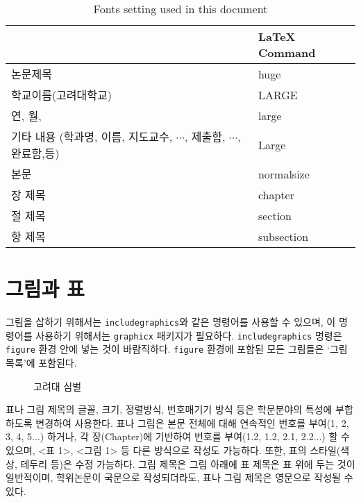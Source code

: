 \documentclass[11pt]{report}
\begin{document}
\begin{table}\centering
\caption{Fonts setting used in this document}
\vspace{0.5cm}
\begin{tabular}{  m{7cm}  m{5cm} }
\toprule 				&     \LaTeX{} Command \\\midrule
논문제목				& huge \\
학교이름(고려대학교)	& LARGE \\
연, 월, 				& large\\
기타 내용 (학과명, 이름, 지도교수, \(\cdots\), 제출함, \(\cdots\), 완료함,등)	& Large\\
본문					& normalsize	\\
장 제목   			& chapter \\
절 제목				& section \\
항 제목				& subsection \\\bottomrule

\end{tabular}
\end{table}



\newpage
\section{그림과 표}\label{sec:figures_and_table}

그림을 삽하기 위해서는 \texttt{includegraphics}와 같은 명령어를 사용할 수 있으며, 이 명령어를 사용하기 위해서는 \texttt{graphicx} 패키지가 필요하다.
\texttt{includegraphics} 명령은 \texttt{figure} 환경 안에 넣는 것이 바람직하다.
\texttt{figure} 환경에 포함된 모든 그림들은 `그림 목록'에 포함된다.

\renewcommand\figurename{그림}
\begin{figure}
\begin{center}
\vspace{0.5cm}
\end{center}
\caption{고려대 심벌}
\end{figure}

표나 그림 제목의 글꼴, 크기, 정렬방식, 번호매기기 방식 등은 학문분야의 특성에 부합하도록 변경하여 사용한다. 표나 그림은 본문 전체에 대해 연속적인 번호를 부여(1, 2, 3, 4, 5...) 하거나, 각 장(Chapter)에 기반하여 번호를 부여(1.2, 1.2, 2.1, 2.2...) 할 수 있으며, <표 1>, <그림 1> 등 다른 방식으로 작성도 가능하다. 또한, 표의 스타일(색상, 테두리 등)은 수정 가능하다. 그림 제목은 그림 아래에 표 제목은 표 위에 두는 것이 일반적이며, 학위논문이 국문으로 작성되더라도, 표나 그림 제목은 영문으로 작성될 수 있다. \par
\end{document}
